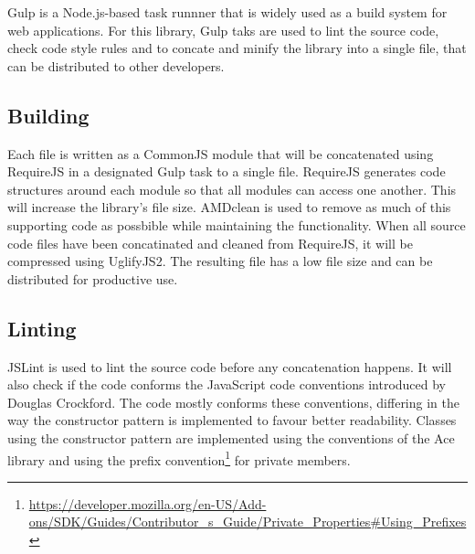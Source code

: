 Gulp is a Node.js-based task runnner that is widely used as a build system for web applications. For this library, Gulp taks are used to lint the source code, check code style rules and to concate and minify the library into a single file, that can be distributed to other developers.

\subsection{Building}

Each file is written as a CommonJS module that will be concatenated using RequireJS in a designated Gulp task to a single file. RequireJS generates code structures around each module so that all modules can access one another. This will increase the library's file size. AMDclean is used to remove as much of this supporting code as possbible while maintaining the functionality. When all source code files have been concatinated and cleaned from RequireJS, it will be compressed using UglifyJS2. The resulting file has a low file size and can be distributed for productive use.

\subsection{Linting}

JSLint is used to lint the source code before any concatenation happens. It will also check if the code conforms the JavaScript code conventions introduced by Douglas Crockford. The code mostly conforms these conventions, differing in the way the constructor pattern is implemented to favour better readability. Classes using the constructor pattern are implemented using the conventions of the Ace library and using the prefix convention\footnote{\url{https://developer.mozilla.org/en-US/Add-ons/SDK/Guides/Contributor\_s\_Guide/Private\_Properties\#Using\_Prefixes}} for private members.





